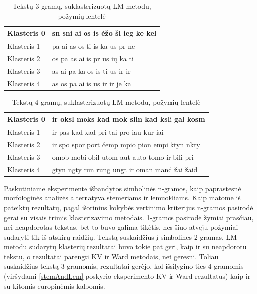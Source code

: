 \documentclass{VUMIFInfBakalaurinis}
\begin{document}
\begin{table}[H]
  \centering
  \caption{Tekstų 3-gramų, suklasterizuotų LM metodu, požymių lentelė}
  \small
  \begin{tabular}{|l|l|}
  \hline
  Klasteris 0 & sn sni ai os is ėžo šl ieg ke kel \\ \hline
  Klasteris 1 & pa ai as os ti is ka us pr ne     \\ \hline
  Klasteris 2 & os pa as ai is pr us ių ka ti     \\ \hline
  Klasteris 3 & as ai pa ka os is ti us ir ir     \\ \hline
  Klasteris 4 & as os pa ai is us ir ir je ka     \\ \hline
  \end{tabular}
  \normalsize
\end{table}

\begin{table}[H]
  \centering
  \caption{Tekstų 4-gramų, suklasterizuotų LM metodu, požymių lentelė}
  \small
  \begin{tabular}{|l|l|}
  \hline
  Klasteris 0 & ir oksl moks kad mok slin kad ksli gal kosm    \\ \hline
  Klasteris 1 & ir pas kad kad pri tai pro iau kur iai         \\ \hline
  Klasteris 2 & ir spo spor port čemp mpio pion empi ktyn nkty \\ \hline
  Klasteris 3 & omob mobi obil utom aut auto tomo ir bili pri  \\ \hline
  Klasteris 4 & gtyn ngty run rung ungt ir oman mand žai žaid  \\ \hline
  \end{tabular}
  \normalsize
\end{table}

Paskutiniame eksperimente išbandytos simbolinės n-gramos, kaip
paprastesnė morfologinės analizės alternatyva stemeriams ir lemuokliams.
Kaip matome iš pateiktų rezultatų, pagal išorinius kokybės vertinimo kriterijus n-gramos
pasirodė gerai su visais trimis klasterizavimo metodais. 1-gramos
pasirodė žymiai prasčiau, nei neapdorotas tekstas, bet to buvo galima
tikėtis, nes šiuo atveju požymiai sudaryti tik iš atskirų raidžių.
Tekstą suskaidžius į simbolines 2-gramas, LM metodu sudarytų klasterių
rezultatai buvo tokie pat geri, kaip ir su neapdorotu tekstu, o
rezultatai parengti KV ir Ward metodais, net geresni. Toliau suskaidžius
tekstą 3-gramomis, rezultatai gerėjo, kol išsilygino ties 4-gramomis
(viršydami \ref{stemAndLem} poskyrio eksperimento KV ir Ward rezultatus) kaip ir su
kitomis europinėmis kalbomis.%
\end{document}
